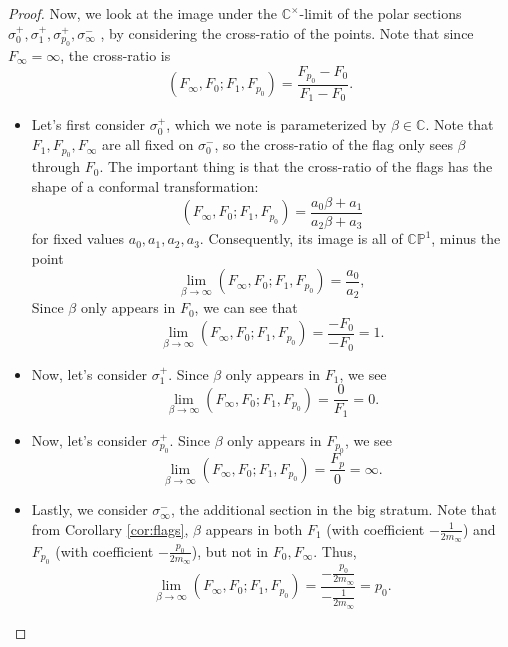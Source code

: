 \documentclass[10pt,a4paper]{amsart}
\newcommand{\C}{\ensuremath{\mathbb C}}
\begin{document}
\begin{proof}
Now, we look at the image under the $\C^\times$-limit of the polar sections $\sigma^+_0, \sigma^+_1, \sigma^+_{p_0}, \sigma_\infty^-$ , by considering the cross-ratio of the points.
Note that since $F_\infty=\infty$, the cross-ratio is 
\[ (F_\infty, F_0; F_1, F_{p_0})= \frac{F_{p_0} - F_0}{F_1-F_0}.\]
\begin{itemize}
\item Let's first consider $\sigma^+_0$, which we note is parameterized by $\beta \in \C$. Note that $F_1, F_{p_0}, F_\infty$ are all fixed on $\sigma^-_0$, so the cross-ratio of the flag only sees $\beta$ through $F_0$.
The important thing is that the cross-ratio of the flags has the shape of a conformal transformation:
\begin{equation} (F_\infty, F_0; F_1, F_{p_0}) = \frac{a_0 \beta + a_1}{a_2 \beta + a_3}\label{eq:conformal}\end{equation}
for fixed values $a_0, a_1, a_2, a_3$. 
Consequently, its image is all of $\mathbb{CP}^1$, minus the point 
\[ \lim_{\beta \to \infty} (F_\infty, F_0; F_1, F_{p_0}) = \frac{a_0}{a_2}, \]
Since $\beta$ only appears in $F_0$, we can see that 
\[ \lim_{\beta \to \infty} (F_\infty, F_0; F_1, F_{p_0}) =\frac{-F_0}{-F_0} = 1.\]
\item Now, let's consider $\sigma^+_1$. Since $\beta$ only appears in $F_1$, we see
\[ \lim_{\beta \to \infty} (F_\infty, F_0; F_1, F_{p_0}) =\frac{0}{F_1} = 0.\]
\item Now, let's consider $\sigma^+_{p_0}$. Since $\beta$ only appears in $F_{p_0}$, we see 
\[ \lim_{\beta \to \infty} (F_\infty, F_0; F_1, F_{p_0}) =\frac{F_p}{0}= \infty.\]
\item 
Lastly, we consider $\sigma_\infty^-$, the additional section in the big stratum. Note that from Corollary \ref{cor:flags}, $\beta$ appears in both $F_1$ (with coefficient $-\frac{1}{2m_\infty}$) and $F_{p_0}$ (with coefficient $-\frac{p_0}{2m_\infty}$), but not in $F_0, F_\infty$. Thus, 
\[ \lim_{\beta \to \infty} (F_\infty, F_0; F_1, F_{p_0}) = \frac{-\frac{p_0}{2m_\infty}}{-\frac{1}{2m_\infty}} = p_0. \]
\end{itemize}



\end{proof}
\end{document}
